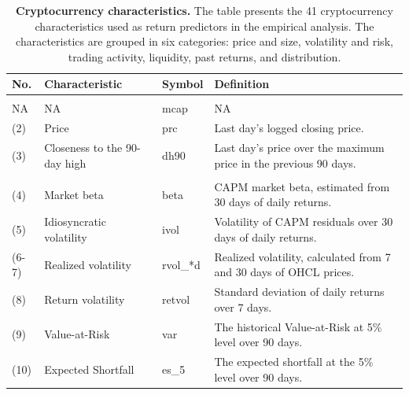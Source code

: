 \documentclass[
  12pt,
  a4paper,
  openany]{scrbook}
\begin{document}
\hfill\break

\begin{table}
\centering
\caption[Cryptocurrency characteristics.]{\label{tab:unnamed-chunk-1}\textbf{Cryptocurrency characteristics.} The table presents the 41 cryptocurrency characteristics used as return predictors in the empirical analysis. The characteristics are grouped in six categories: price and size, volatility and risk, trading activity, liquidity, past returns, and distribution. \label{tbl-characteristics}}
\centering
\fontsize{8}{10}\selectfont
\begin{tabular}[t]{l>{\raggedright\arraybackslash}p{10em}l>{\raggedright\arraybackslash}p{27em}}
\toprule
No. & Characteristic & Symbol & Definition\\
\midrule
\addlinespace[0.3em]
\multicolumn{4}{l}{\textbf{Panel A: Price \& size}}\\
\hspace{1em}NA & NA & mcap & NA\\
\hspace{1em}(2) & Price & prc & Last day's logged closing price.\\
\hspace{1em}(3) & Closeness to the 90-day high & dh90 & Last day's price over the maximum price in the previous 90 days.\\
\addlinespace[0.3em]
\multicolumn{4}{l}{\textbf{Panel B: Volatility \& risk}}\\
\hspace{1em}(4) & Market beta & beta & CAPM market beta, estimated from 30 days of daily returns.\\
\hspace{1em}(5) & Idiosyncratic volatility & ivol & Volatility of CAPM residuals over 30 days of daily returns.\\
\hspace{1em}(6-7) & Realized volatility & rvol\_*d & Realized volatility, calculated from 7 and 30 days of OHCL prices.\\
\hspace{1em}(8) & Return volatility & retvol & Standard deviation of daily returns over 7 days.\\
\hspace{1em}(9) & Value-at-Risk & var & The historical Value-at-Risk at 5\% level over 90 days.\\
\hspace{1em}(10) & Expected Shortfall & es\_5 & The expected shortfall at the 5\% level over 90 days.\\

\end{tabular}
\end{table}
\end{document}
